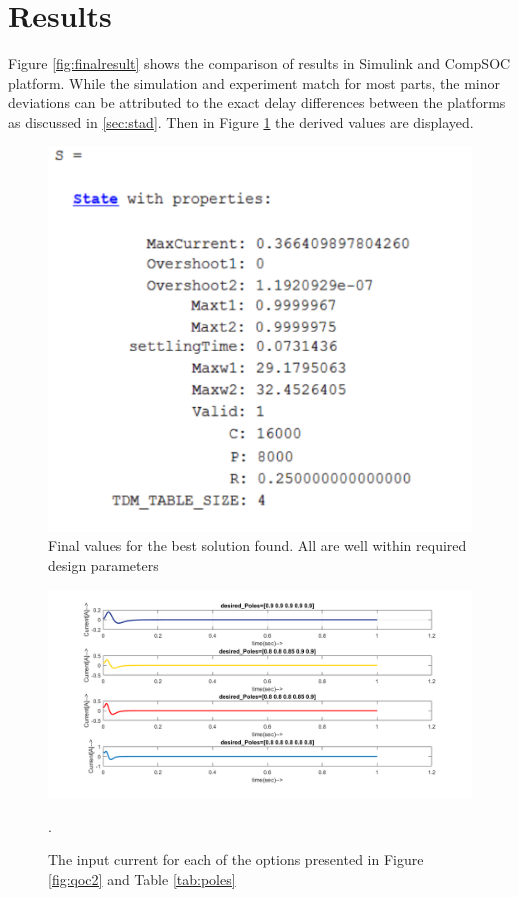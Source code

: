 
\section{Results}

Figure \ref{fig:finalresult} shows the comparison of results in Simulink and CompSOC platform. While the simulation and experiment match for most parts, the minor deviations can be attributed to the exact delay differences between the platforms as discussed in \ref{sec:stad}. Then in Figure \ref{fig:Sresult} the derived values are displayed.


\begin{figure}[h!]
	\begin{center}
		\includegraphics[width=0.5\linewidth]{img/S}
		\caption{Final values for the best solution found. All are well within required design parameters}
		\label{fig:Sresult}
	\end{center}
\end{figure}

\begin{figure}[h]
	\begin{center}
		\includegraphics[width=0.8\linewidth]{img/current}
		\caption{The input current for each of the options presented in Figure \ref{fig:qoc2} and Table \ref{tab:poles}}.
		\label{fig:current}
	\end{center}
\end{figure}


